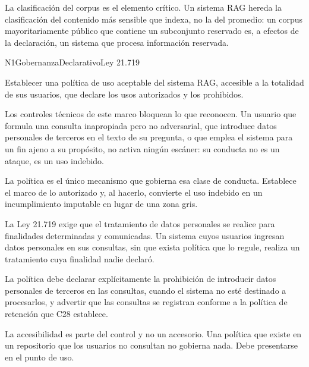 La clasificación del corpus es el elemento crítico. Un sistema RAG hereda la clasificación del contenido más sensible que indexa, no la del promedio: un corpus mayoritariamente público que contiene un subconjunto reservado es, a efectos de la declaración, un sistema que procesa información reservada.


  {N1}{Gobernanza}{Declarativo}{Ley 21.719}

Establecer una política de uso aceptable del sistema RAG, accesible a la totalidad de sus usuarios, que declare los usos autorizados y los prohibidos.

Los controles técnicos de este marco bloquean lo que reconocen. Un usuario que formula una consulta inapropiada pero no adversarial, que introduce datos personales de terceros en el texto de su pregunta, o que emplea el sistema para un fin ajeno a su propósito, no activa ningún escáner: su conducta no es un ataque, es un uso indebido.

La política es el único mecanismo que gobierna esa clase de conducta. Establece el marco de lo autorizado y, al hacerlo, convierte el uso indebido en un incumplimiento imputable en lugar de una zona gris.

La Ley 21.719 exige que el tratamiento de datos personales se realice para finalidades determinadas y comunicadas. Un sistema cuyos usuarios ingresan datos personales en sus consultas, sin que exista política que lo regule, realiza un tratamiento cuya finalidad nadie declaró.

La política debe declarar explícitamente la prohibición de introducir datos personales de terceros en las consultas, cuando el sistema no esté destinado a procesarlos, y advertir que las consultas se registran conforme a la política de retención que C28 establece.

La accesibilidad es parte del control y no un accesorio. Una política que existe en un repositorio que los usuarios no consultan no gobierna nada. Debe presentarse en el punto de uso.


